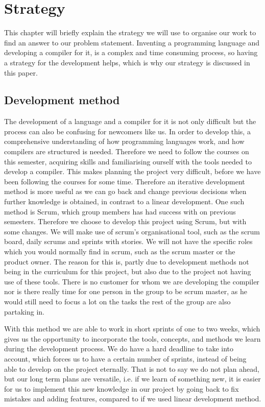 \chapter{Strategy}\label{Metode}

This chapter will briefly explain the strategy we will use to organise our work to find an answer to our problem statement. 
Inventing a programming language and developing a compiler for it, is a complex and time consuming process, so having a strategy for the development helps, which is why our strategy is discussed in this paper.

\section{Development method}
The development of a language and a compiler for it is not only difficult but the process can also be confusing for newcomers like us. 
In order to develop this, a comprehensive understanding of how programming languages work, and how compilers are structured is needed.
Therefore we need to follow the courses on this semester, acquiring skills and familiarising ourself with the tools needed to develop a compiler.
This makes planning the project very difficult, before we have been following the courses for some time.
Therefore an iterative development method is more useful as we can go back and change previous decisions when further knowledge is obtained, in contrast to a linear development.
One such method is Scrum, which group members has had success with on previous semesters.
Therefore we choose to develop this project using Scrum, but with some changes.
We will make use of scrum's organisational tool, such as the scrum board, daily scrums and sprints with stories.
We will not have the specific roles which you would normally find in scrum, such as the scrum master or the product owner. \citep{Scrum}
The reason for this is, partly due to development methods not being in the curriculum for this project, but also due to the project not having use of these tools.
There is no customer for whom we are developing the compiler nor is there really time for one person in the group to be scrum master, as he would still need to focus a lot on the tasks the rest of the group are also partaking in.

With this method we are able to work in short sprints of one to two weeks, which gives us the opportunity to incorporate the tools, concepts, and methods we learn during the development process.
We do have a hard deadline to take into account, which forces us to have a certain number of sprints, instead of being able to develop on the project eternally.
That is not to say we do not plan ahead, but our long term plans are versatile, i.e. if we learn of something new, it is easier for us to implement this new knowledge in our project by going back to fix mistakes and adding features, compared to if we used linear development method.